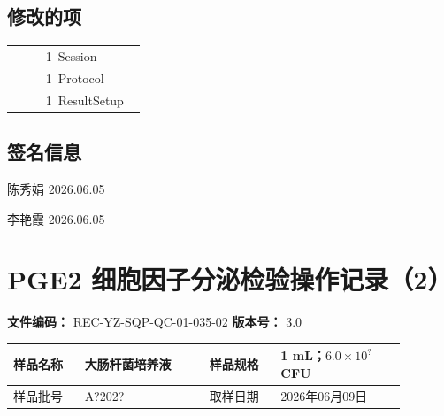 \documentclass[UTF8,10pt,a4paper,fontset=fandol]{ctexart}
\newcommand{\fieldvalue}[1]{#1}
\newcommand{\handwritten}[1]{#1}
\begin{document}
\subsection*{修改的项}

\begin{tabular}{@{}p{0.22\linewidth}p{0.68\linewidth}@{}}
&
\fieldvalue{1\ Session} \\

&
\fieldvalue{1\ Protocol} \\

&
\fieldvalue{1\ ResultSetup} \\
\end{tabular}

\subsection*{签名信息}

\vfill

\handwritten{陈秀娟}\quad
\handwritten{2026.06.05}

\medskip

\handwritten{李艳霞}\quad
\handwritten{2026.06.05}


\newpage

\section{PGE2 细胞因子分泌检验操作记录（2）}

\noindent
\textbf{文件编码：} REC-YZ-SQP-QC-01-035-02 \qquad
\textbf{版本号：} 3.0

\begin{tabular}{|p{0.16\linewidth}|p{0.28\linewidth}|p{0.16\linewidth}|p{0.28\linewidth}|}
\hline
样品名称 &
\fieldvalue{\handwritten{大肠杆菌培养液}} &
样品规格 &
\fieldvalue{\handwritten{1 mL；$6.0\times10^{?}$ CFU}} \\
\hline
样品批号 &
\fieldvalue{\handwritten{A?202?}} &
取样日期 &
\fieldvalue{\handwritten{2026年06月09日}} \\
\hline
\end{tabular}
\end{document}
